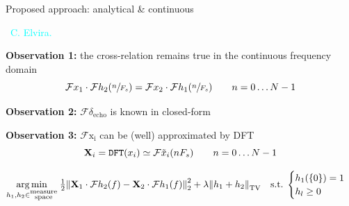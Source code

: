 \begin{frame}{Proposed approach: analytical \& continuous \hfill\faJediOrder}

    {\hfill \textcolor{cyan}{\faPeopleCarry~C. Elvira.}}

    \begin{block}{\textbf{Observation 1:} the cross-relation remains true in the \alert{continuous} frequency domain}
        \begin{equation*}
            \mathcal{F}x_1 \cdot \mathcal{F}h_2 (\sfrac{n}{F_s}) = \mathcal{F}x_2 \cdot \mathcal{F}h_1(\sfrac{n}{F_s}) \qquad n=0\dots N-1
        \end{equation*}
        \end{block}

        \vspace{.5em}

        \pause
        \begin{block}{\textbf{Observation 2:} $\mathcal{F}\delta_{\mathrm{echo}}$ is known in \alert{closed-form}}
        \end{block}

        \pause
        \vspace{1.em}
        \begin{block}{\textbf{Observation 3:} $\mathcal{F}{\mathrm{x_i}}$ can be (well) approximated by \alert{DFT}}
        \begin{equation*}
            \mathbf{X}_i = \texttt{DFT}(x_i) \simeq  \mathcal{F}{\tilde{x}_i}(nF_s) \qquad n=0\dots N-1
        \end{equation*}
        \end{block}


        \pause
        \vfill
        \begin{mycontriblock}
                \begin{equation*}
                    \underset{h_1,h_2 \in \substack{\text{measure} \\ \text{space}}}{\arg\min} \;
            \tfrac{1}{2} \kvvbar{
                \mathbf{X}_1 \cdot \mathcal{F}h_2 (f) - \mathbf{X}_2 \cdot \mathcal{F}h_1(f)
                }_2^2
                + \lambda \kvvbar{h_1 + h_2}_{\mathrm{TV}}
                \quad
                \text{s.t.}\;
                \begin{cases}
                    h_1(\{0\})=1 \\
                    h_l \geq 0
                \end{cases}
            \end{equation*}
        \end{mycontriblock}


\end{frame}
